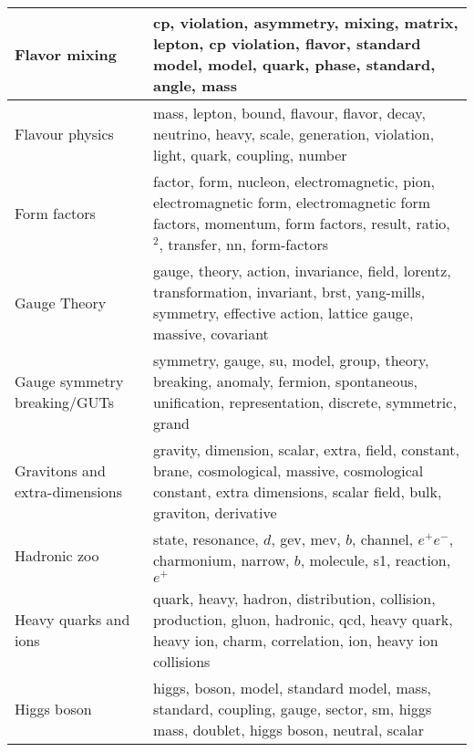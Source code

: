 \begin{longtable}[H]{p{}|p{}}
Flavor mixing                                         &                                                                         cp, violation, asymmetry, mixing, matrix, lepton, cp violation, flavor, standard model, model, quark, phase, standard, angle, mass \\ \midrule
Flavour physics                                       &                                                                                 mass, lepton, bound, flavour, flavor, decay, neutrino, heavy, scale, generation, violation, light, quark, coupling, number \\ \midrule
Form factors                                          &                                  factor, form, nucleon, electromagnetic, pion, electromagnetic form, electromagnetic form factors, momentum, form factors, result, ratio, $^2$, transfer, nn, form-factors \\ \midrule
Gauge Theory                                          &                                              gauge, theory, action, invariance, field, lorentz, transformation, invariant, brst, yang-mills, symmetry, effective action, lattice gauge, massive, covariant \\ \midrule
Gauge symmetry breaking/GUTs                          &                                                                symmetry, gauge, su, model, group, theory, breaking, anomaly, fermion, spontaneous, unification, representation, discrete, symmetric, grand \\ \midrule
Gravitons and extra-dimensions                        &                                        gravity, dimension, scalar, extra, field, constant, brane, cosmological, massive, cosmological constant, extra dimensions, scalar field, bulk, graviton, derivative \\ \midrule
Hadronic zoo                                          &                                                                                            state, resonance, $d$, gev, mev, $b$, channel, $e^+e^-$, charmonium, narrow, $b$, molecule, s1, reaction, $e^+$ \\ \midrule
Heavy quarks and ions                                 &                                                     quark, heavy, hadron, distribution, collision, production, gluon, hadronic, qcd, heavy quark, heavy ion, charm, correlation, ion, heavy ion collisions \\ \midrule
Higgs boson                                           &                                                                        higgs, boson, model, standard model, mass, standard, coupling, gauge, sector, sm, higgs mass, doublet, higgs boson, neutral, scalar \\ \midrule

\end{longtable}
